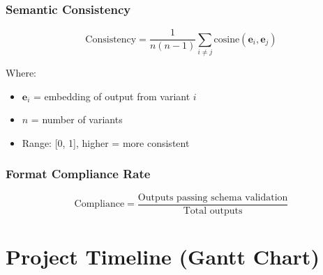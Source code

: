 \documentclass[11pt,a4paper]{article}
\begin{document}
\subsubsection{Semantic Consistency}

\[
\text{Consistency} = \frac{1}{n(n-1)} \sum_{i \neq j} \text{cosine}(\mathbf{e}_i, \mathbf{e}_j)
\]

Where:
\begin{itemize}
    \item $\mathbf{e}_i$ = embedding of output from variant $i$
    \item $n$ = number of variants
    \item Range: [0, 1], higher = more consistent
\end{itemize}

\subsubsection{Format Compliance Rate}

\[
\text{Compliance} = \frac{\text{Outputs passing schema validation}}{\text{Total outputs}}
\]

\section{Project Timeline (Gantt Chart)}
\end{document}
